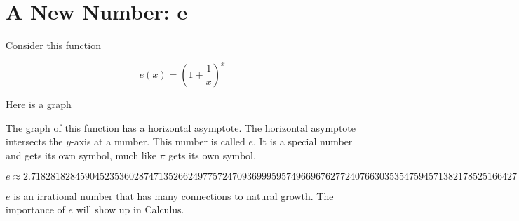\documentclass{ximera}
\begin{document}
\section*{A New Number: e}


Consider this function 

\[
e(x) = \left(1 + \frac{1}{x}\right)^x
\]



Here is a graph


\begin{center}
\end{center}


The graph of this function has a horizontal asymptote.  The horizontal asymptote intersects the $y$-axis at a number.  This number is called $e$.   It is a special number and gets its own symbol, much like $\pi$ gets its own symbol.



\[
e \approx  2.718281828459045235360287471352662497757247093699959574966967627724076630353547594571382178525166427
\]


$e$ is an irrational number that has many connections to natural growth.  The importance of $e$ will show up in Calculus.
\end{document}
